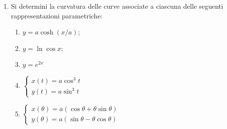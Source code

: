 \begin{enumerate}
\item Si determini la curvatura delle curve associate a ciascuna delle
seguenti rappresentazioni parametriche:
\begin{enumerate}
\item $y=a\cosh(x/a)$;
\item $y=\ln\cos x$;
\item $y=e^{2x}$
\item $\left\{\begin{array}{l}
x(t)=a\cos^3t \\
y(t)=a\sin^3t
\end{array}\right.$
\item $\left\{\begin{array}{l}
x(\theta)=a(\cos\theta+\theta\sin\theta) \\
y(\theta)=a(\sin\theta-\theta\cos\theta)
\end{array}\right.$
\end{enumerate}

\end{enumerate}



